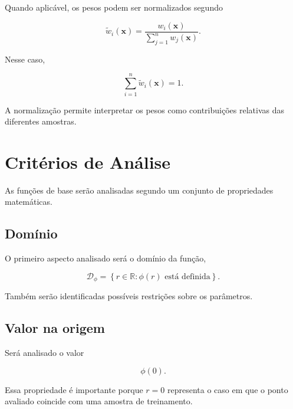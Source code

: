 \documentclass[12pt,a4paper]{article}
\newcommand{\R}{\mathbb{R}}
\begin{document}
	Quando aplicável, os pesos podem ser normalizados segundo
	
	\begin{equation}
		\widetilde{w}_i(\mathbf{x})
		=
		\frac{
			w_i(\mathbf{x})
		}{
			\displaystyle\sum_{j=1}^{n}w_j(\mathbf{x})
		}.
	\end{equation}
	
	Nesse caso,
	
	\begin{equation}
		\sum_{i=1}^{n}
		\widetilde{w}_i(\mathbf{x})
		=
		1.
	\end{equation}
	
	A normalização permite interpretar os pesos como contribuições relativas
	das diferentes amostras.
	
	
	\section{Critérios de Análise}
	
	As funções de base serão analisadas segundo um conjunto de propriedades
	matemáticas.
	
	\subsection{Domínio}
	
	O primeiro aspecto analisado será o domínio da função,
	
	\begin{equation}
		\mathcal{D}_{\phi}
		=
		\left\{
		r \in \R :
		\phi(r) \text{ está definida}
		\right\}.
	\end{equation}
	
	Também serão identificadas possíveis restrições sobre os parâmetros.
	
	\subsection{Valor na origem}
	
	Será analisado o valor
	
	\begin{equation}
		\phi(0).
	\end{equation}
	
	Essa propriedade é importante porque $r=0$ representa o caso em que o
	ponto avaliado coincide com uma amostra de treinamento.
	
\end{document}
